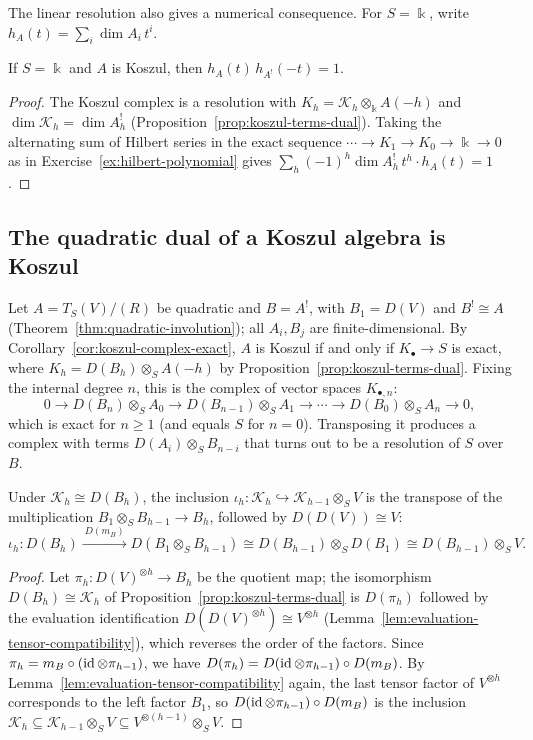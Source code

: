 The linear resolution also gives a numerical consequence.
For $S=\Bbbk$, write $h_A(t)=\sum_i\dim A_i\,t^i$.

\begin{corollary}\label{cor:hilbert-koszul}
If $S=\Bbbk$ and $A$ is Koszul, then $h_A(t)\,h_{A^!}(-t)=1$.
\end{corollary}

\begin{proof}
The Koszul complex is a resolution with $K_h=\mathcal K_h\otimes_\Bbbk A(-h)$ and $\dim\mathcal K_h=\dim A^!_h$ (Proposition~\ref{prop:koszul-terms-dual}).
Taking the alternating sum of Hilbert series in the exact sequence $\cdots\to K_1\to K_0\to\Bbbk\to0$ as in Exercise~\ref{ex:hilbert-polynomial} gives $\sum_h(-1)^h\dim A^!_h\,t^h\cdot h_A(t)=1$.
\end{proof}

\subsection{The quadratic dual of a Koszul algebra is Koszul}

Let $A=T_S(V)/(R)$ be quadratic and $B=A^!$, with $B_1=D(V)$ and $B^!\cong A$ (Theorem~\ref{thm:quadratic-involution}); all $A_i,B_j$ are finite-dimensional.
By Corollary~\ref{cor:koszul-complex-exact}, $A$ is Koszul if and only if $K_\bullet\to S$ is exact, where $K_h=D(B_h)\otimes_SA(-h)$ by Proposition~\ref{prop:koszul-terms-dual}.
Fixing the internal degree $n$, this is the complex of vector spaces $K_{\bullet,n}$:
\[
0\to D(B_n)\otimes_SA_0\to D(B_{n-1})\otimes_SA_1\to\cdots\to D(B_0)\otimes_SA_n\to0,
\]
which is exact for $n\geq1$ (and equals $S$ for $n=0$).
Transposing it produces a complex with terms $D(A_i)\otimes_SB_{n-i}$ that turns out to be a resolution of $S$ over $B$.

\begin{lemma}\label{lem:koszul-differential-transpose}
Under $\mathcal K_h\cong D(B_h)$, the inclusion $\iota_h:\mathcal K_h\hookrightarrow\mathcal K_{h-1}\otimes_SV$ is the transpose of the multiplication $B_1\otimes_SB_{h-1}\to B_h$, followed by $D(D(V))\cong V$:
\[
\iota_h:D(B_h)\xrightarrow{\ D(m_B)\ }D(B_1\otimes_SB_{h-1})\cong D(B_{h-1})\otimes_SD(B_1)\cong D(B_{h-1})\otimes_SV.
\]
\end{lemma}

\begin{supplementary}
\begin{proof}
Let $\pi_h:D(V)^{\otimes h}\to B_h$ be the quotient map; the isomorphism $D(B_h)\cong\mathcal K_h$ of Proposition~\ref{prop:koszul-terms-dual} is $D(\pi_h)$ followed by the evaluation identification $D(D(V)^{\otimes h})\cong V^{\otimes h}$ (Lemma~\ref{lem:evaluation-tensor-compatibility}), which reverses the order of the factors.
Since $\pi_h=m_B\circ(\operatorname{id}\otimes\pi_{h-1})$, we have $D(\pi_h)=D(\operatorname{id}\otimes\pi_{h-1})\circ D(m_B)$.
By Lemma~\ref{lem:evaluation-tensor-compatibility} again, the last tensor factor of $V^{\otimes h}$ corresponds to the left factor $B_1$, so $D(\operatorname{id}\otimes\pi_{h-1})\circ D(m_B)$ is the inclusion $\mathcal K_h\subseteq\mathcal K_{h-1}\otimes_SV\subseteq V^{\otimes(h-1)}\otimes_SV$.
\end{proof}
\end{supplementary}

